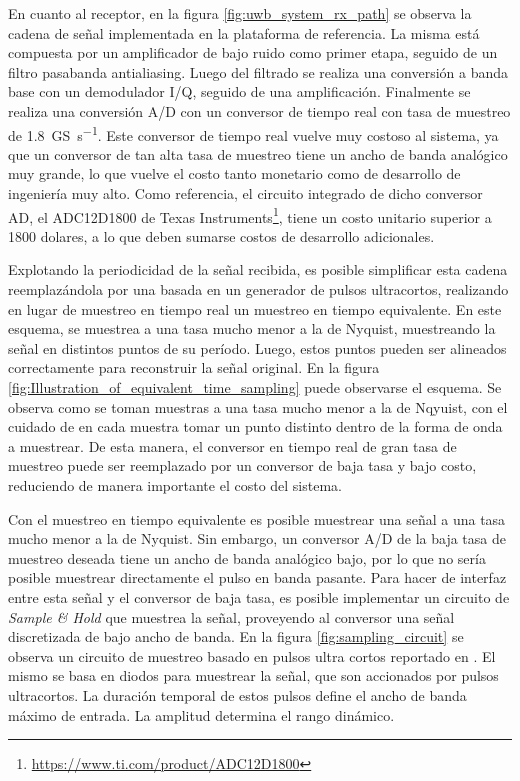 En cuanto al receptor, en la figura \ref{fig:uwb_system_rx_path} se observa la
cadena de señal implementada en la plataforma de referencia. La misma está
compuesta por un amplificador de bajo ruido como primer etapa, seguido de un
filtro pasabanda antialiasing. Luego del filtrado se realiza una conversión a
banda base con un demodulador I/Q, seguido de una amplificación. Finalmente se
realiza una conversión A/D con un conversor de tiempo real con tasa de muestreo
de \qty[per-mode=symbol]{1.8}{\giga\siemens\per\second}. Este conversor de
tiempo real vuelve muy costoso al sistema, ya que un conversor de tan alta tasa
de muestreo tiene un ancho de banda analógico muy grande, lo que vuelve el costo
tanto monetario como de desarrollo de ingeniería muy alto.  Como referencia, el
circuito integrado de dicho conversor AD, el ADC12D1800 de Texas
Instruments\footnote{\url{https://www.ti.com/product/ADC12D1800}}, tiene un
costo unitario superior a 1800 dolares, a lo que deben sumarse costos de
desarrollo adicionales.

Explotando la periodicidad de la señal recibida, es posible simplificar esta
cadena reemplazándola por una basada en un generador de pulsos ultracortos,
realizando en lugar de muestreo en tiempo real un muestreo en tiempo
equivalente. En este esquema, se muestrea a una tasa mucho menor a la de
Nyquist, muestreando la señal en distintos puntos de su período. Luego, estos
puntos pueden ser alineados correctamente para reconstruir la señal original. En
la figura \ref{fig:Illustration_of_equivalent_time_sampling} puede observarse el
esquema.  Se observa como se toman muestras a una tasa mucho menor a la de
Nqyuist, con el cuidado de en cada muestra tomar un punto distinto dentro de la
forma de onda a muestrear. De esta manera, el conversor en tiempo real de gran
tasa de muestreo puede ser reemplazado por un conversor de baja tasa y bajo
costo, reduciendo de manera importante el costo del sistema.

Con el muestreo en tiempo equivalente es posible muestrear una señal a una tasa
mucho menor a la de Nyquist. Sin embargo, un conversor A/D de la baja tasa de
muestreo deseada tiene un ancho de banda analógico bajo, por lo que no sería
posible muestrear directamente el pulso en banda pasante. Para hacer de interfaz
entre esta señal y el conversor de baja tasa, es posible implementar un circuito
de \textit{Sample \& Hold} que muestrea la señal, proveyendo al conversor una
señal discretizada de bajo ancho de banda. En la figura
\ref{fig:sampling_circuit} se observa un circuito de muestreo basado en pulsos
ultra cortos reportado en \cite{han2004}. El mismo se basa en diodos para
muestrear la señal, que son accionados por pulsos ultracortos. La duración
temporal de estos pulsos define el ancho de banda máximo de entrada. La amplitud
determina el rango dinámico.


